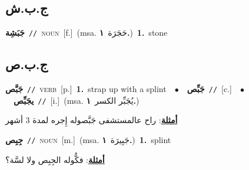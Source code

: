 \documentclass[10pt,a4paper,twoside]{article} %
\begin{document}
\begin{multicols}{2}
\vspace{-3mm}
\subsection*{\color{blue}\foreignlanguage{arabic}{ج.ب.ش}\color{blue}{}} 

{\setlength\topsep{0pt}\textbf{\foreignlanguage{arabic}{جَبَشِة}}\ {\color{gray}\texttt{//}\color{black}}\ \textsc{noun}\ [f.]\ \color{gray}(msa. \foreignlanguage{arabic}{حَجَرَة}~\foreignlanguage{arabic}{\textbf{١.}})\color{black}\ \textbf{1.}~stone\ } \vspace{2mm}

\vspace{-3mm}
\subsection*{\color{blue}\foreignlanguage{arabic}{ج.ب.ص}\color{blue}{}} 

{\setlength\topsep{0pt}\textbf{\foreignlanguage{arabic}{جَبَّص}}\ {\color{gray}\texttt{//}\color{black}}\ \textsc{verb}\ [p.]\ \textbf{1.}~strap up with a splint\ \ $\bullet$\ \ \setlength\topsep{0pt}\textbf{\foreignlanguage{arabic}{جَبِّص}}\ {\color{gray}\texttt{//}\color{black}}\ [c.]\ \ $\bullet$\ \ \setlength\topsep{0pt}\textbf{\foreignlanguage{arabic}{يجَبِّص}}\ {\color{gray}\texttt{//}\color{black}}\ [i.]\ \color{gray}(msa. \foreignlanguage{arabic}{يُجَبِّر الكسر}~\foreignlanguage{arabic}{\textbf{١.}})\color{black}\  \begin{flushright}\color{gray}\foreignlanguage{arabic}{\textbf{\underline{\foreignlanguage{arabic}{أمثلة}}}: راح عالمستشفى جَبَّصوله إِجره لمدة 3 أشهر}\end{flushright}\color{black}} \vspace{2mm}

{\setlength\topsep{0pt}\textbf{\foreignlanguage{arabic}{جِبِص}}\ {\color{gray}\texttt{//}\color{black}}\ \textsc{noun}\ [m.]\ \color{gray}(msa. \foreignlanguage{arabic}{جَبِيرَة}~\foreignlanguage{arabic}{\textbf{١.}})\color{black}\ \textbf{1.}~splint\  \begin{flushright}\color{gray}\foreignlanguage{arabic}{\textbf{\underline{\foreignlanguage{arabic}{أمثلة}}}: فكُّوله الجِبِص ولا لسَّة؟}\end{flushright}\color{black}} \vspace{2mm}


\end{multicols}
\end{document}
